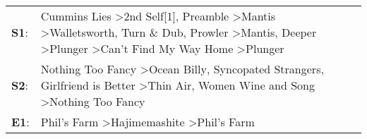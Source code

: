 \begin{supertabular}{p{0.03\textwidth}p{0.92\textwidth}}
 \textbf{S1}:  &  Cummins Lies\textsuperscript{} \textgreater \enspace 2nd Self[1]\textsuperscript{}, \enspace Preamble\textsuperscript{} \textgreater \enspace Mantis\textsuperscript{} \textgreater \enspace Walletsworth\textsuperscript{}, \enspace Turn \& Dub\textsuperscript{}, \enspace Prowler\textsuperscript{} \textgreater \enspace Mantis\textsuperscript{}, \enspace Deeper\textsuperscript{} \textgreater \enspace Plunger\textsuperscript{} \textgreater \enspace Can't Find My Way Home\textsuperscript{} \textgreater \enspace Plunger\textsuperscript{}  \enspace  \\
 \textbf{S2}:  &                                                                                                                                                                                                      Nothing Too Fancy\textsuperscript{} \textgreater \enspace Ocean Billy\textsuperscript{}, \enspace Syncopated Strangers\textsuperscript{}, \enspace Girlfriend is Better\textsuperscript{} \textgreater \enspace Thin Air\textsuperscript{}, \enspace Women Wine and Song\textsuperscript{} \textgreater \enspace Nothing Too Fancy\textsuperscript{}  \enspace  \\
 \textbf{E1}:  &                                                                                                                                                                                                                                                                                                                                                                                                                   Phil's Farm\textsuperscript{} \textgreater \enspace Hajimemashite\textsuperscript{} \textgreater \enspace Phil's Farm\textsuperscript{}  \enspace  \\
\end{supertabular}

